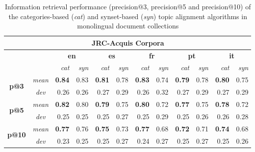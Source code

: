 \begin{table}[ht]\centering
\begin{center}
\small
\begin{tabular}{cc|rr||rr||rr||rr||rr}
    \hline
    \multicolumn{12}{c}{\textbf{JRC-Acquis Corpora}} \\
    \hline
    & & \multicolumn{2}{c}{\textbf{en}} &
      \multicolumn{2}{c}{\textbf{es}} &
      \multicolumn{2}{c}{\textbf{fr}} &
      \multicolumn{2}{c}{\textbf{pt}} &
      \multicolumn{2}{c}{\textbf{it}} \\
    & & {\textit{cat}} & {\textit{syn}} & {\textit{cat}} & {\textit{syn}} & {\textit{cat}} & {\textit{syn}} & {\textit{cat}} & {\textit{syn}} & {\textit{cat}} & {\textit{syn}} \\
    \hline
    \multirow{2}{*}{\textbf{p@3}} 
    &{\textit{mean}}    &\textbf{0.84} &0.83 &\textbf{0.81} &0.78 &\textbf{0.83} &0.74 &\textbf{0.79} &0.78 &\textbf{0.80} &0.75 \\
    &{\textit{dev}}     &0.26 &0.26 &0.27 &0.29 &0.26 &0.32 &0.27 &0.29 &0.27 &0.29 \\
    \hline
    \multirow{2}{*}{\textbf{p@5}} 
    &{\textit{mean}}    &\textbf{0.82} &0.80 &\textbf{0.79} &0.75 &\textbf{0.80} &0.72 &\textbf{0.77} &0.75 &\textbf{0.78} &0.72 \\
    &{\textit{dev}}     &0.25 &0.25 &0.25 &0.27 &0.25 &0.29 &0.25 &0.26 &0.26 &0.28 \\
    \hline
    \multirow{2}{*}{\textbf{p@10}} 
    &{\textit{mean}}    &\textbf{0.77} &0.76 &\textbf{0.75} &0.73 &\textbf{0.77} &0.68 &\textbf{0.72} &0.71 &\textbf{0.74} &0.68 \\
    &{\textit{dev}}     &0.23 &0.25 &0.25 &0.27 &0.24 &0.27 &0.25 &0.27 &0.25 &0.26 \\
\end{tabular}
\end{center}
\caption{Information retrieval performance (precision@3, precision@5 and precision@10) of the categories-based (\textit{cat}) and synset-based (\textit{syn}) topic alignment algorithms in monolingual document collections}
\label{tb:mono-ir}
\end{table}

